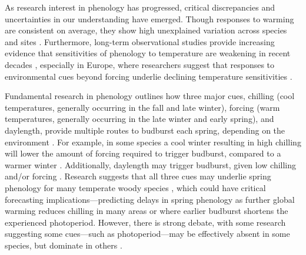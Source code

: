 \documentclass{article}
\begin{document}
\par As research interest in phenology has progressed, critical discrepancies and uncertainties in our understanding have emerged. Though responses to warming are consistent on average, they show high unexplained variation across species and sites \citep{Wolkovich:2012n}. Furthermore, long-term observational studies provide increasing evidence that sensitivities of phenology to temperature are weakening in recent decades \cite{Rutishauser:2008,yu2010}, especially in Europe, where researchers suggest that responses to environmental cues beyond forcing underlie declining temperature sensitivities \cite{fu2015}.

\par Fundamental research in phenology outlines how three major cues, chilling (cool temperatures, generally occurring in the fall and late winter), forcing (warm temperatures, generally occurring in the late winter and early spring), and daylength, provide multiple routes to budburst %
each spring, depending on the environment \citep{chuineJTB}. For example, in some species a cool winter resulting in high chilling will lower the amount of forcing required to trigger budburst, compared to a warmer winter \citep{harrington2015}. Additionally, daylength may trigger budburst, given low chilling and/or forcing \citep{Basler:2014aa, Caffarra:2011b, zohner2016}. Research suggests that all three cues may underlie spring phenology for many temperate woody species \citep{flynn2018,Basler:2014aa,Caffarra:2011qf}, which could have critical forecasting implications---predicting delays in spring phenology as further global warming reduces chilling in many areas \citep{fraga2019} or where earlier budburst shortens the experienced photoperiod. %
However, there is strong debate, with some research suggesting some cues---such as photoperiod---may be effectively absent in some species, but dominate in others \citep{zohner2016,koerner2010a}. 
\end{document}
